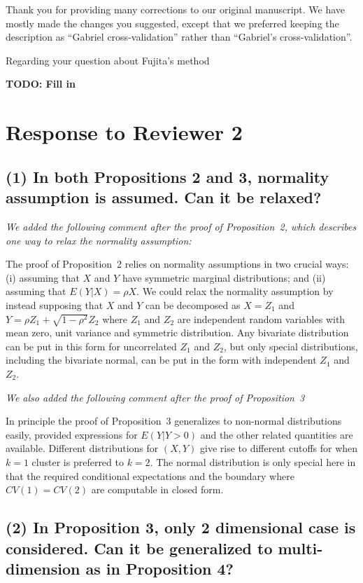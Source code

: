 \documentclass[11pt]{article}
\begin{document}
Thank you for providing many corrections to our original manuscript. We have
mostly made the changes you suggested, except that we preferred keeping the
description as ``Gabriel cross-validation'' rather than ``Gabriel's
cross-validation''.

Regarding your question about Fujita's method 

\textbf{\Large{TODO: Fill in}}


\section{Response to Reviewer 2}

\subsection{(1) In both Propositions 2 and 3, normality assumption is assumed.
Can it be relaxed?}

\emph{We added the following comment after the proof of Proposition~2, which
describes one way to relax the normality assumption:}

The proof of Proposition~2 relies on normality assumptions
in two crucial ways: (i) assuming that $X$ and $Y$ have symmetric marginal
distributions; and (ii) assuming that $E(Y|X) = \rho X$. We could relax the
normality assumption by instead supposing that $X$ and $Y$ can be decomposed
as $X = Z_1$ and $Y = \rho Z_1 + \sqrt{1-\rho^2}Z_2$ where $Z_1$ and $Z_2$ are
independent random variables with mean zero, unit variance and symmetric
distribution. Any bivariate distribution can be put in this form for
uncorrelated $Z_1$ and $Z_2$, but only special distributions, including the
bivariate normal, can be put in the form with independent $Z_1$ and $Z_2$.

\emph{We also added the following comment after the proof of Proposition~3}

In principle the proof of Proposition~3 generalizes to non-normal
distributions easily, provided expressions for $E(Y | Y > 0)$ and the other
related quantities are available. Different distributions for $(X,Y)$ give
rise to different cutoffs for when $k = 1$ cluster is preferred to $k = 2$.
The normal distribution is only special here in that the required conditional
expectations and the boundary where $CV(1) = CV(2)$ are computable in closed
form. 


\subsection{(2) In Proposition 3, only 2 dimensional case is considered. Can
it be generalized to multi-dimension as in Proposition 4?}
\end{document}
